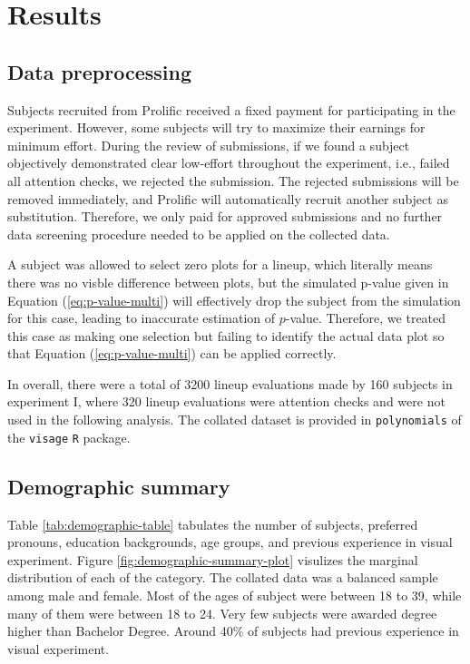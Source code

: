 \documentclass[]{interact}
\theoremstyle{plain}%
\theoremstyle{definition}
\theoremstyle{remark}
\begin{document}
\hypertarget{results}{%
\section{Results}\label{results}}

\hypertarget{data-preprocessing}{%
\subsection{Data preprocessing}\label{data-preprocessing}}

Subjects recruited from Prolific received a fixed payment for
participating in the experiment. However, some subjects will try to
maximize their earnings for minimum effort. During the review of
submissions, if we found a subject objectively demonstrated clear
low-effort throughout the experiment, i.e., failed all attention checks,
we rejected the submission. The rejected submissions will be removed
immediately, and Prolific will automatically recruit another subject as
substitution. Therefore, we only paid for approved submissions and no
further data screening procedure needed to be applied on the collected
data.

A subject was allowed to select zero plots for a lineup, which literally
means there was no visble difference between plots, but the simulated
p-value given in Equation (\ref{eq:p-value-multi}) will effectively drop
the subject from the simulation for this case, leading to inaccurate
estimation of \(p\)-value. Therefore, we treated this case as making one
selection but failing to identify the actual data plot so that Equation
(\ref{eq:p-value-multi}) can be applied correctly.

In overall, there were a total of 3200 lineup evaluations made by 160
subjects in experiment I, where 320 lineup evaluations were attention
checks and were not used in the following analysis. The collated dataset
is provided in \texttt{polynomials} of the \texttt{visage} \texttt{R}
package.

\hypertarget{demographic-summary}{%
\subsection{Demographic summary}\label{demographic-summary}}

Table \ref{tab:demographic-table} tabulates the number of subjects,
preferred pronouns, education backgrounds, age groups, and previous
experience in visual experiment. Figure
\ref{fig:demographic-summary-plot} visulizes the marginal distribution
of each of the category. The collated data was a balanced sample among
male and female. Most of the ages of subject were between 18 to 39,
while many of them were between 18 to 24. Very few subjects were awarded
degree higher than Bachelor Degree. Around 40\% of subjects had previous
experience in visual experiment.
\end{document}

